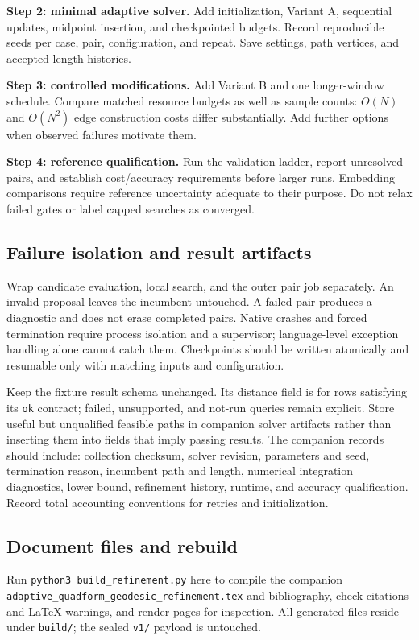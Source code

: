 \documentclass[11pt,letterpaper]{article}
\newcommand{\src}[1]{\nolinkurl{#1}}
\begin{document}
\textbf{Step 2: minimal adaptive solver.} Add initialization, Variant A, sequential updates, midpoint insertion, and checkpointed budgets. Record reproducible seeds per case, pair, configuration, and repeat. Save settings, path vertices, and accepted-length histories.

\textbf{Step 3: controlled modifications.} Add Variant B and one longer-window schedule. Compare matched resource budgets as well as sample counts: $O(N)$ and $O(N^2)$ edge construction costs differ substantially. Add further options when observed failures motivate them.

\textbf{Step 4: reference qualification.} Run the validation ladder, report unresolved pairs, and establish cost/accuracy requirements before larger runs. Embedding comparisons require reference uncertainty adequate to their purpose. Do not relax failed gates or label capped searches as converged.

\subsection{Failure isolation and result artifacts}
Wrap candidate evaluation, local search, and the outer pair job separately. An invalid proposal leaves the incumbent untouched. A failed pair produces a diagnostic and does not erase completed pairs. Native crashes and forced termination require process isolation and a supervisor; language-level exception handling alone cannot catch them. Checkpoints should be written atomically and resumable only with matching inputs and configuration.

Keep the fixture result schema unchanged. Its distance field is for rows satisfying its \src{ok} contract; failed, unsupported, and not-run queries remain explicit. Store useful but unqualified feasible paths in companion solver artifacts rather than inserting them into fields that imply passing results. The companion records should include: collection checksum, solver revision, parameters and seed, termination reason, incumbent path and length, numerical integration diagnostics, lower bound, refinement history, runtime, and accuracy qualification. Record total accounting conventions for retries and initialization.

\subsection{Document files and rebuild}
Run \texttt{python3 build\_refinement.py} here to compile the companion \src{adaptive_quadform_geodesic_refinement.tex} and bibliography, check citations and LaTeX warnings, and render pages for inspection. All generated files reside under \src{build/}; the sealed \src{v1/} payload is untouched.
\end{document}

